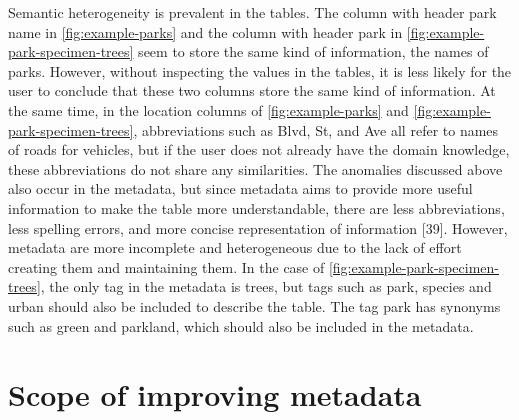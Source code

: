 Semantic heterogeneity is prevalent in the tables. The column with header park name in \autoref{fig:example-parks} and the column with header park in \autoref{fig:example-park-specimen-trees} seem to store the same kind of information, the names of parks. However, without inspecting the values in the tables, it is less likely for the user to conclude that these two columns store the same kind of information. At the same time, in the location columns of \autoref{fig:example-parks} and \autoref{fig:example-park-specimen-trees}, abbreviations such as Blvd, St, and Ave all refer to names of roads for vehicles, but if the user does not already have the domain knowledge, these abbreviations do not share any similarities.
The anomalies discussed above also occur in the metadata, but since metadata aims to provide more useful information to make the table more understandable, there are less abbreviations, less spelling errors, and more concise representation of information \cite{Rahm2016Case}[39]. However, metadata are more incomplete and heterogeneous due to the lack of effort creating them and maintaining them. In the case of \autoref{fig:example-park-specimen-trees}, the only tag in the metadata is trees, but tags such as park, species and urban should also be included to describe the table. The tag park has synonyms such as green and parkland, which should also be included in the metadata.

\section{Scope of improving metadata}
\label{sec:ScopeOfImprovingMetadata}

